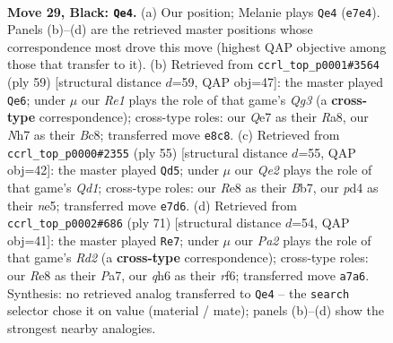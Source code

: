 \documentclass[11pt]{article}
\begin{document}
\clearpage

\begin{figure}[p]\centering
\begin{subfigure}{0.46\textwidth}\centering
\resizebox{\linewidth}{!}{%
\newchessgame
\chessboard[
  setfen={4r2k/p1ppq2n/5p1Q/8/1PPP4/8/2P2P1P/1R4K1 b - - 0 29},
  showmover=false,
  pgfstyle=straightmove, color=movearrow, markmove={e7-e4}
]}
\caption{}
\end{subfigure}\hfill
\begin{subfigure}{0.46\textwidth}\centering
\resizebox{\linewidth}{!}{%
\newchessgame
\chessboard[
  setfen={r1bQ4/1p4k1/6q1/p4p2/P7/2P5/1P3PPP/R5K1 b - - 2 30},
  showmover=false,
  pgfstyle=straightmove, color=movearrow, markmove={g6-e6}
]}
\caption{}
\end{subfigure}
\\[4pt]
\begin{subfigure}{0.46\textwidth}\centering
\resizebox{\linewidth}{!}{%
\newchessgame
\chessboard[
  setfen={3q1r2/1b3p1k/pp3n2/4N1Q1/3P2P1/P7/1P3P1P/4R1K1 b - - 0 28},
  showmover=false,
  pgfstyle=straightmove, color=movearrow, markmove={d8-d5}
]}
\caption{}
\end{subfigure}\hfill
\begin{subfigure}{0.46\textwidth}\centering
\resizebox{\linewidth}{!}{%
\newchessgame
\chessboard[
  setfen={4k1q1/p1pr4/1p1pnR2/8/2P1Q3/2P5/P4PP1/5K2 b - - 14 36},
  showmover=false,
  pgfstyle=straightmove, color=movearrow, markmove={d7-e7}
]}
\caption{}
\end{subfigure}
\caption{\textbf{Move 29, Black: \texttt{Qe4}.} (a) Our position; Melanie plays \texttt{Qe4} (\texttt{e7e4}). Panels (b)--(d) are the retrieved master positions whose correspondence most drove this move (highest QAP objective among those that transfer to it). (b) Retrieved from \texttt{ccrl\_top\_p0001\#3564} (ply 59) [structural distance $d$=59, QAP obj=47]: the master played \texttt{Qe6}; under $\mu$ our \emph{Re1} plays the role of that game's \emph{Qg3} (a \textbf{cross-type} correspondence); cross-type roles: our \emph{Q}e7 as their \emph{R}a8, our \emph{N}h7 as their \emph{B}c8; transferred move \texttt{e8c8}. (c) Retrieved from \texttt{ccrl\_top\_p0000\#2355} (ply 55) [structural distance $d$=55, QAP obj=42]: the master played \texttt{Qd5}; under $\mu$ our \emph{Qe2} plays the role of that game's \emph{Qd1}; cross-type roles: our \emph{R}e8 as their \emph{B}b7, our \emph{p}d4 as their \emph{n}e5; transferred move \texttt{e7d6}. (d) Retrieved from \texttt{ccrl\_top\_p0002\#686} (ply 71) [structural distance $d$=54, QAP obj=41]: the master played \texttt{Re7}; under $\mu$ our \emph{Pa2} plays the role of that game's \emph{Rd2} (a \textbf{cross-type} correspondence); cross-type roles: our \emph{R}e8 as their \emph{P}a7, our \emph{q}h6 as their \emph{r}f6; transferred move \texttt{a7a6}. Synthesis: no retrieved analog transferred to \texttt{Qe4} -- the \texttt{search} selector chose it on value (material / mate); panels (b)--(d) show the strongest nearby analogies.}
\label{fig:thought-m57}
\end{figure}
\end{document}
